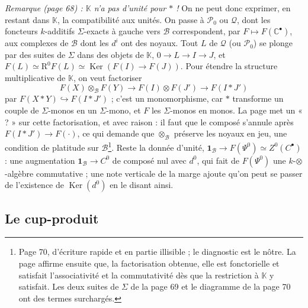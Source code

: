 \documentclass[11pt,a4paper]{article}
\begin{document}
\emph{Remarque (page 68) : $\mathbb{K}$ n'a pas d'unité pour $*$ !} On ne
peut donc exprimer, en restant dans $\mathbb{K}$, la compatibilité aux
unités. On passe à $\mathcal{P}_{0}$ ou $\mathcal{Q}$, dont les foncteurs
$k$-additifs $\Sigma$-exacts à gauche vers $\mathcal{B}$ correspondent, par
$F \mapsto F(\mathbb{C}^{\bullet})$, aux complexes de $\mathcal{B}$ dont les
$d^{i}$ ont des noyaux. Tout $L$ de $\mathcal{Q}$ (ou $\mathcal{P}_{0}$) se
plonge par des suites de $\Sigma$ dans des objets de $\mathbb{K}$, $0 \to L
\to I \to J$, et $F(L) \simeq \mathrm{R}^{0}F(L) \simeq \operatorname{Ker}(F(I)
\to F(J))$. Pour étendre la structure multiplicative de $\mathbb{K}$, on veut
factoriser
\[
  F(X) \otimes_{\mathcal{B}} F(Y) \to F(I) \otimes F(J') \to F(I * J')
\]
par $F(X * Y) \hookrightarrow F(I * J')$ ; c'est un monomorphisme, car $*$
transforme un couple de $\Sigma$-monos en un $\Sigma$-mono, et $F$ les
$\Sigma$-monos en monos. La page met un « ? » sur cette factorisation, et
avec raison : il faut que le composé s'annule après $F(I * J') \to F(\cdot)$,
ce qui demande que $\otimes_{\mathcal{B}}$ préserve les noyaux en jeu, une
condition de platitude sur $\mathcal{B}$\footnote{Page 70, d'écriture rapide
et en partie illisible ; le diagnostic est le nôtre. La page affirme ensuite
que, la factorisation obtenue, elle est fonctorielle et satisfait
l'associativité et la commutativité dès que la restriction à $\mathbb{K}$ y
satisfait. Les deux suites de $\Sigma$ de la page 69 et le diagramme de la
page 70 ont des termes surchargés.}. Reste la donnée d'unité,
$\mathbf{1}_{\mathcal{B}} \to F(\Psi^{0}) \simeq Z^{0}(C^{\bullet})$ : une
augmentation $\mathbf{1}_{\mathcal{B}} \to C^{0}$ de composé nul avec
$d^{0}$, qui fait de $F(\Psi^{0})$ une $k$-$\otimes$-algèbre commutative ;
une note verticale de la marge ajoute qu'on peut se passer de l'existence de
$\operatorname{Ker}(d^{0})$ en le disant ainsi.

\subsection*{Le cup-produit}
\end{document}
